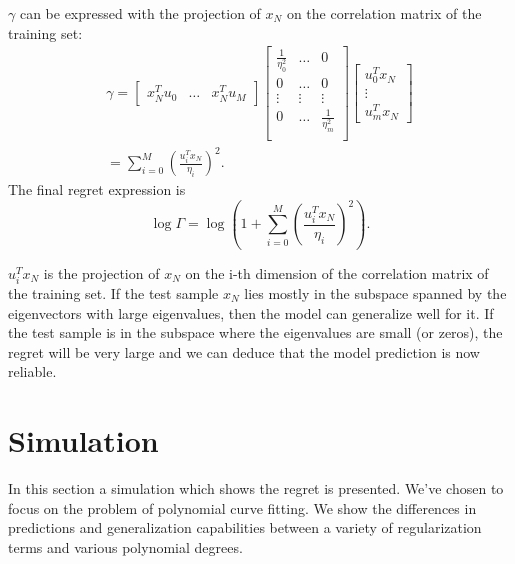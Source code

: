 \documentclass[conference,letterpaper]{IEEEtran}
\begin{document}
$\gamma$ can be expressed with the projection of $x_N$ on the correlation matrix of the training set:
\begin{multline}
\gamma = 
\begin{bmatrix}
x_N^T u_0 & \hdots & x_N^T u_M
\end{bmatrix}
\begin{bmatrix}
\frac{1}{\eta_0^2} & \hdots & 0 \\
0 & \hdots &  0 \\
\vdots & \vdots &  \vdots \\
0 & \hdots &  \frac{1}{\eta_m^2} \\
\end{bmatrix}
\begin{bmatrix}
u_0^T x_N \\ \vdots \\ u_m^T x_N
\end{bmatrix} \\
= \sum_{i=0}^M \left(\frac{u_i^T x_N}{\eta_i}\right)^2.
\end{multline}
The final regret expression is
\begin{equation}
\log \Gamma = \log \left(1 +  \sum_{i=0}^M \left(\frac{u_i^T x_N}{\eta_i}\right)^2 \right).
\end{equation}

$u_i^T x_N$ is the projection of $x_N$ on the i-th dimension of the correlation matrix of the training set. If the test sample $x_N$ lies mostly in the subspace spanned by the eigenvectors with large eigenvalues, then the model can generalize well for it. If the test sample is in the subspace where the eigenvalues are small (or zeros), the regret will be very large and we can deduce that the model prediction is now reliable.

\section{Simulation} \label{sec:simulation}
In this section a  simulation which shows the regret is presented.
We've chosen to focus on the problem of polynomial curve fitting. 
We show the differences in predictions and generalization capabilities between a variety of regularization terms and various polynomial degrees.
\end{document}
